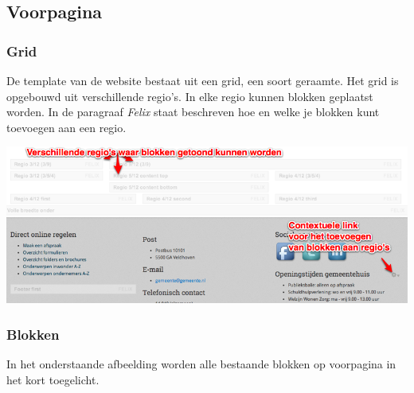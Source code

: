 
\subsection{Voorpagina}\label{voorpagina}

\subsubsection{Grid}

De template van de website bestaat uit een grid, een soort geraamte. Het grid is opgebouwd uit verschillende regio's. In elke regio kunnen blokken geplaatst worden. In de paragraaf \emph{Felix} staat beschreven hoe en welke je blokken kunt toevoegen aan een regio. 

\bigskip

\begin{center}
	\includegraphics[width=\textwidth]{img/grid1.png}
\end{center}

\subsubsection{Blokken}

In het onderstaande afbeelding worden alle bestaande blokken op voorpagina in het kort toegelicht.

\bigskip

